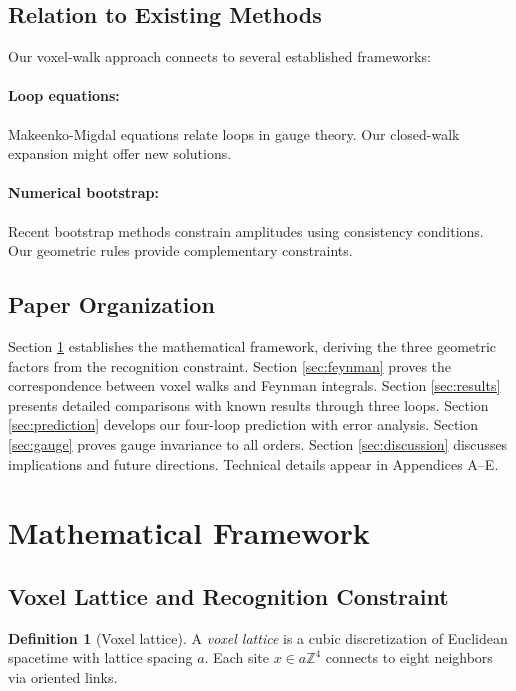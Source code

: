 \documentclass[11pt,a4paper]{article}
\theoremstyle{definition}
\newtheorem{definition}[theorem]{Definition}
\theoremstyle{remark}
\begin{document}
\subsection{Relation to Existing Methods}

Our voxel-walk approach connects to several established frameworks:

\paragraph{Loop equations:} Makeenko-Migdal equations \cite{Makeenko1979} relate loops in gauge theory. Our closed-walk expansion might offer new solutions.

\paragraph{Numerical bootstrap:} Recent bootstrap methods \cite{Paulos2016,Gopakumar2017} constrain amplitudes using consistency conditions. Our geometric rules provide complementary constraints.

\subsection{Paper Organization}

Section \ref{sec:framework} establishes the mathematical framework, deriving the three geometric factors from the recognition constraint. Section \ref{sec:feynman} proves the correspondence between voxel walks and Feynman integrals. Section \ref{sec:results} presents detailed comparisons with known results through three loops. Section \ref{sec:prediction} develops our four-loop prediction with error analysis. Section \ref{sec:gauge} proves gauge invariance to all orders. Section \ref{sec:discussion} discusses implications and future directions. Technical details appear in Appendices A–E.

\section{Mathematical Framework}
\label{sec:framework}

\subsection{Voxel Lattice and Recognition Constraint}

\begin{definition}[Voxel lattice]
A \emph{voxel lattice} is a cubic discretization of Euclidean spacetime with lattice spacing $a$. Each site $x \in a\mathbb{Z}^4$ connects to eight neighbors via oriented links.
\end{definition}
\end{document}
